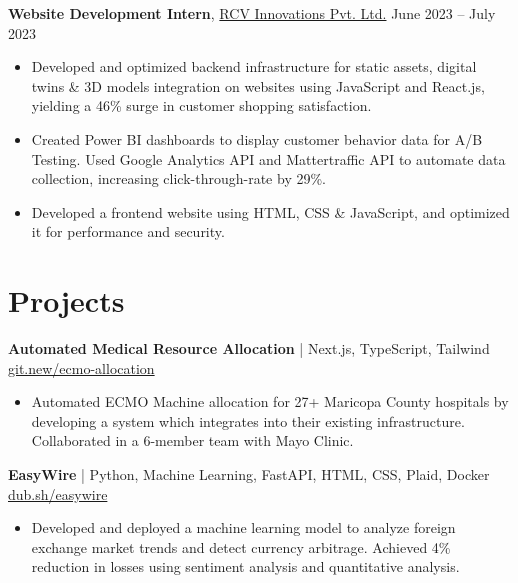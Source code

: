 \documentclass[11pt]{article}       %
\begin{document}
\textbf{Website Development Intern}, \href{https://www.rcvinnovations.com/}{RCV Innovations Pvt. Ltd.} \hfill June 2023 -- July 2023 \\
\vspace{-5pt}
\begin{itemize}
\item Developed and optimized backend infrastructure for static assets, digital twins \& 3D models integration on websites using JavaScript and React.js, yielding a 46\% surge in customer shopping satisfaction. 
\item Created Power BI dashboards to display customer behavior data for A/B Testing. Used Google Analytics API and Mattertraffic API to automate data collection, increasing click-through-rate by 29\%.
\item Developed a frontend website using HTML, CSS \& JavaScript, and optimized it for performance and security.

\end{itemize}


\vspace{-15.5pt}

\section*{Projects}


\textbf{Automated Medical Resource Allocation} | Next.js, TypeScript, Tailwind \hfill \href{https://git.new/ecmo-allocation}{\color{blue} git.new/ecmo-allocation} \\
\vspace{-6pt}
\begin{itemize}
\item Automated ECMO Machine allocation for 27+ Maricopa County hospitals by developing a system which integrates into their existing infrastructure. Collaborated in a 6-member team with Mayo Clinic.
\end{itemize}

\textbf{EasyWire} | Python, Machine Learning, FastAPI, HTML, CSS, Plaid, Docker \hfill \href{https://dub.sh/easywire}{\color{blue} dub.sh/easywire} \\
\vspace{-6pt}
\begin{itemize}
  \item Developed and deployed a machine learning model to analyze foreign exchange market trends and detect currency arbitrage. Achieved 4\% reduction in losses using sentiment analysis and quantitative analysis.
\end{itemize}
\end{document}

